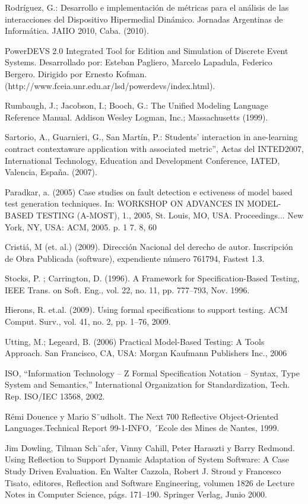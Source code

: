 \begin{thebibliography}{1}
{\bibitem{}
Rodríguez, G.: Desarrollo e implementación de métricas para el
análisis de las interacciones del Dispositivo Hipermedial Dinámico. Jornadas
Argentinas de Informática. JAIIO 2010, Caba. (2010).

\bibitem{}
PowerDEVS 2.0 Integrated Tool for Edition and Simulation of Discrete
Event Systems. Desarrollado por: Esteban Pagliero, Marcelo Lapadula, Federico
Bergero. Dirigido por Ernesto
Kofman. (http://www.fceia.unr.edu.ar/lsd/powerdevs/index.html).

\bibitem{} 
Rumbaugh, J.; Jacobson, I.; Booch, G.: The Unified Modeling Language
Reference Manual. Addison Wesley Logman, Inc.; Massachusetts (1999).


\bibitem{}
Sartorio, A., Guarnieri, G., San Martín, P.: Students’ interaction in
ane-learning contract contextaware application with associated metric”, Actas
del INTED2007, International Technology, Education and Development Conference,
IATED, Valencia, España. (2007).

\bibitem{}
Paradkar, a. (2005) Case studies on fault detection e ectiveness of model
based test generation techniques. In: WORKSHOP ON ADVANCES IN MODEL-BASED
TESTING (A-MOST), 1., 2005, St. Louis, MO, USA. Proceedings... New York, NY,
USA: ACM, 2005. p. 1 7. 8, 60

\bibitem{}
Cristiá, M (et. al.) (2009). Dirección Nacional del derecho de autor.
Inscripción de Obra Publicada (software), expendiente número 761794, Fastest
1.3.

\bibitem{}
Stocks, P. ;  Carrington, D. (1996). A Framework for Specification-Based
Testing, IEEE Trans. on Soft. Eng., vol. 22, no. 11, pp. 777–793, Nov. 1996.


\bibitem{}
Hierons,  R. et.al. (2009). Using formal specifications to support
testing.  ACM Comput. Surv., vol. 41, no. 2, pp. 1–76, 2009.

\bibitem{}
Utting, M.;  Legeard, B. (2006) Practical Model-Based Testing: A Tools
Approach.  San Francisco, CA, USA: Morgan Kaufmann Publishers Inc., 2006

\bibitem{}
ISO, “Information Technology – Z Formal Specification Notation – Syntax, Type
System and Semantics,” International Organization for Standardization,  Tech.
Rep. ISO/IEC 13568, 2002.


\bibitem{}
Rémi Douence y Mario S¨udholt. The Next 700 Reflective Object-Oriented
Languages.Technical Report 99-1-INFO, ´Ecole des Mines de Nantes, 1999.

\bibitem{}
Jim Dowling, Tilman Sch¨afer, Vinny Cahill, Peter Haraszti y Barry
Redmond. Using Reflection to Support Dynamic Adaptation of System Software: A
Case Study Driven Evaluation. En Walter Cazzola, Robert J. Stroud y Francesco
Tisato, editores, Reflection and Software Engineering, volumen 1826 de Lecture
Notes in Computer Science, págs. 171–190. Springer Verlag, Junio 2000.

}
\end{thebibliography}
